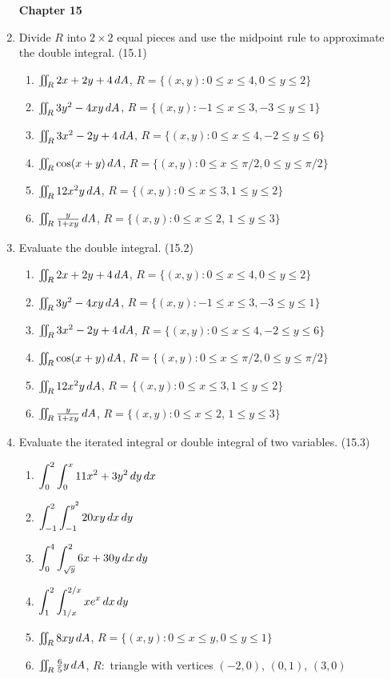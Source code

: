\begin{enumerate}
\newpage
\centerline{\bf Chapter 15}

    \item Divide $R$ into $2\times 2$ equal pieces and use the midpoint rule to approximate the double integral. (15.1)

      \begin{enumerate}
        \item $\iint_R 2x+2y+4 \,d{A}$, $R = \{(x,y) : 0\leq x\leq 4, 0\leq y\leq 2\}$
        \item $\iint_R 3y^2-4xy\,d{A}$, $R = \{(x,y) : -1\leq x\leq 3, -3\leq y\leq 1\}$
        \item $\iint_R 3x^2-2y+4\,d{A}$, $R = \{(x,y) : 0\leq x\leq 4, -2\leq y\leq 6\}$
        \item $\iint_R \cos(x+y)\,d{A}$, $R = \{ (x,y) : 0\leq x\leq \pi/2, 0\leq y\leq \pi/2\}$
        \item $\iint_R 12x^2y\,d{A}$, $R = \{ (x,y) : 0\leq x\leq 3, 1\leq y\leq 2\}$
        \item $\iint_R \frac{y}{1+xy}\,d{A}$, $R = \{ (x,y) : 0\leq x\leq 2$, $1\leq y\leq 3\}$
      \end{enumerate}

    \item Evaluate the double integral. (15.2)

      \begin{enumerate}
        \item $\iint_R 2x+2y+4 \,d{A}$, $R = \{(x,y) : 0\leq x\leq 4, 0\leq y\leq 2\}$
        \item $\iint_R 3y^2-4xy\,d{A}$, $R = \{(x,y) : -1\leq x\leq 3, -3\leq y\leq 1\}$
        \item $\iint_R 3x^2-2y+4\,d{A}$, $R = \{(x,y) : 0\leq x\leq 4, -2\leq y\leq 6\}$
        \item $\iint_R \cos(x+y)\,d{A}$, $R = \{ (x,y) : 0\leq x\leq \pi/2, 0\leq y\leq \pi/2\}$
        \item $\iint_R 12x^2y\,d{A}$, $R = \{ (x,y) : 0\leq x\leq 3, 1\leq y\leq 2\}$
        \item $\iint_R \frac{y}{1+xy}\,d{A}$, $R = \{ (x,y) : 0\leq x\leq 2$, $1\leq y\leq 3\}$
      \end{enumerate}

    \item Evaluate the iterated integral or double integral of two variables. (15.3)

      \begin{enumerate}
        \item $\displaystyle\int_0^2\int_0^x 11x^2+3y^2\,d{y}\,d{x}$
        \item $\displaystyle\int_{-1}^2\int_{-1}^{y^2} 20xy\,d{x}\,d{y}$
        \item $\displaystyle\int_0^4\int_{\sqrt{y}}^2 6x+30y\,d{x}\,d{y}$
        \item $\displaystyle\int_{1}^{2}\int_{1/x}^{2/x} xe^x \,d{x}\,d{y}$
        \item $\iint_R 8xy\,d{A}$, $R = \{ (x,y) : 0\leq x\leq y,0\leq y\leq 1\}$
        \item $\iint_R \frac{6}{5}y\,d{A}$, $R:$ triangle with vertices $(-2,0)$, $(0,1)$, $(3,0)$
      \end{enumerate}


\end{enumerate}
